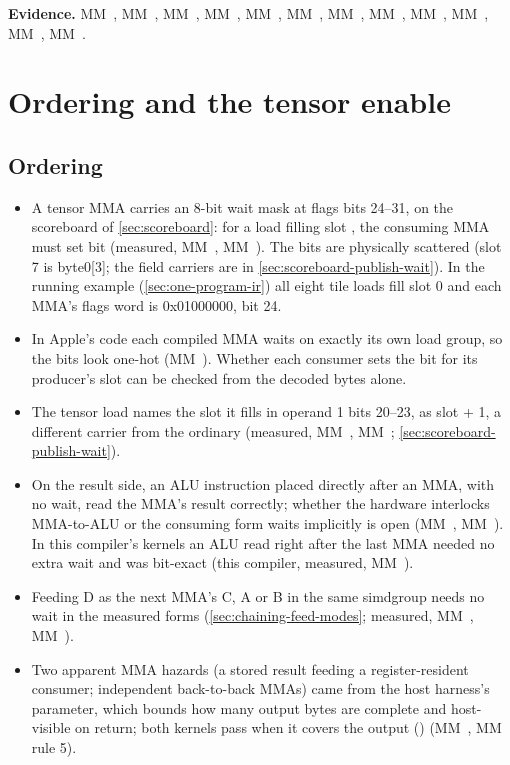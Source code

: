 \textbf{Evidence.} MM~, MM~, MM~, MM~, MM~, MM~, MM~, MM~, MM~, MM~, MM~, MM~.

\section{Ordering and the tensor enable}\label{sec:ordering-enable}

\subsection*{Ordering}

\begin{itemize}
\item A tensor MMA carries an 8-bit wait mask at flags bits 24–31, on the scoreboard of \cref{sec:scoreboard}: for a load
  filling slot , the consuming MMA must set bit  (measured, MM~, MM~). The bits are
  physically scattered (slot 7 is byte0{[}3{]}; the field carriers are in \cref{sec:scoreboard-publish-wait}). In the
  running example (\cref{sec:one-program-ir}) all eight tile loads fill slot 0 and each MMA's flags word is
  0x01000000, bit 24.
\item In Apple's code each compiled MMA waits on exactly its own load group, so the bits look one-hot (MM~).
  Whether each consumer sets the bit for its producer's slot can be checked from the decoded bytes alone.
\item The tensor load names the slot it fills in operand 1 bits 20–23, as slot + 1, a different carrier from the ordinary
   (measured, MM~, MM~; \cref{sec:scoreboard-publish-wait}).
\item On the result side, an ALU instruction placed directly after an MMA, with no wait, read the MMA's result correctly;
  whether the hardware interlocks MMA-to-ALU or the consuming form waits implicitly is open (MM~, MM~). In
  this compiler's kernels an ALU read right after the last MMA needed no extra wait and was bit-exact (this compiler, measured,
  MM~).
\item Feeding D as the next MMA's C, A or B in the same simdgroup needs no wait in the measured forms
  (\cref{sec:chaining-feed-modes}; measured, MM~, MM~).
\item Two apparent MMA hazards (a stored result feeding a register-resident consumer; independent back-to-back MMAs)
  came from the host harness's  parameter, which bounds how many output bytes are complete
  and host-visible on return; both kernels pass when it covers the output () (MM~, MM~ rule 5).
\end{itemize}

